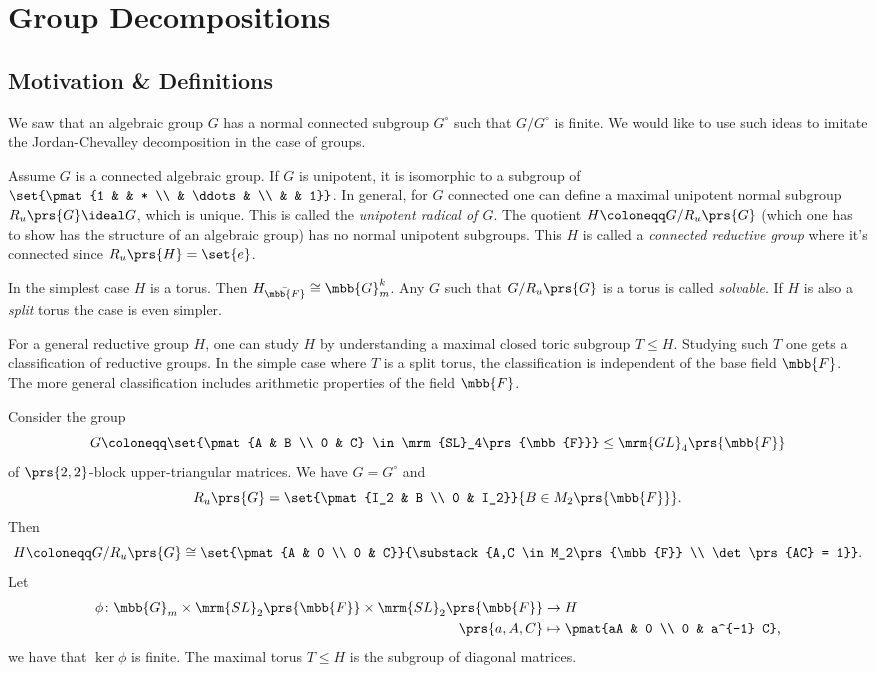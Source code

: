 \documentclass[10pt,a4paper,twoside,openany,hidelinks]{book}
\begin{document}
\section{Group Decompositions}

\subsection{Motivation \& Definitions}

We saw that an algebraic group $G$ has a normal connected subgroup $G^\circ$ such that $G/G^\circ$ is finite. We would like to use such ideas to imitate the Jordan-Chevalley decomposition in the case of groups.

Assume $G$ is a connected algebraic group. If $G$ is unipotent, it is isomorphic to a subgroup of
$\set{\pmat{1 & & * \\ & \ddots & \\ & & 1}}$.
In general, for $G$ connected one can define a maximal unipotent normal subgroup $R_u\prs{G} \ideal G$, which is unique.
This is called the \emph{unipotent radical of $G$}.
The quotient $H \coloneqq G/R_u\prs{G}$ (which one has to show has the structure of an algebraic group) has no normal unipotent subgroups. This $H$ is called a \emph{connected reductive group} where it's connected since $R_u\prs{H} = \set{e}$.

In the simplest case $H$ is a torus. Then $H_{\bar{\mbb{F}}} \cong \mbb{G}_m^k$.
Any $G$ such that $G/R_u\prs{G}$ is a torus is called \emph{solvable}.
If $H$ is also a \emph{split} torus the case is even simpler.

For a general reductive group $H$, one can study $H$ by understanding a maximal closed toric subgroup $T \leq H$. Studying such $T$ one gets a classification of reductive groups. In the simple case where $T$ is a split torus, the classification is independent of the base field $\mbb{F}$. The more general classification includes arithmetic properties of the field $\mbb{F}$.

\begin{example}
Consider the group
\[G \coloneqq \set{\pmat{A & B \\ 0 & C} \in \mrm{SL}_4\prs{\mbb{F}}} \leq \mrm{GL}_4\prs{\mbb{F}}\]
of $\prs{2,2}$-block upper-triangular matrices.
We have $G = G^\circ$ and
\[R_u\prs{G} = \set{\pmat{I_2 & B \\ 0 & I_2}}{B \in M_2\prs{\mbb{F}}} \text{.}\]
Then
\[H \coloneqq G/R_u\prs{G} \cong \set{\pmat{A & 0 \\ 0 & C}}{\substack{A,C \in M_2\prs{\mbb{F}} \\ \det\prs{AC} = 1}} \text{.}\]
Let
\begin{align*}
\phi \colon \mbb{G}_m \times \mrm{SL}_2\prs{\mbb{F}} \times  \mrm{SL}_2\prs{\mbb{F}} &\to H \\
\prs{a,A,C} &\mapsto \pmat{aA & 0 \\ 0 & a^{-1} C} \text{,}
\end{align*}
we have that $\ker\phi$ is finite. The maximal torus $T \leq H$ is the subgroup of diagonal matrices.
\end{example}
\end{document}
